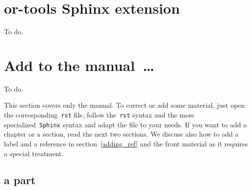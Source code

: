 \documentclass[a4paper,10pt]{article}
\newcommand{\code}[1]{\texttt{#1}}
\begin{document}

\section{or-tools Sphinx extension}

To do.

\section{Add to the manual~\ldots}
\label{write_documentation}

To do.

This section covers only the manual. To correct or add some material, just open the corresponding~\code{rst} file, follow the~\code{rst} syntax and the more specialized~\code{Sphinx} syntax and adapt the file to your needs. If you want to add a chapter or a section, read the next two sections. We discuss also how to add a label and a reference in section~\ref{adding_ref} and the front material as it requires a special treatment.

\subsection{a part}
\end{document}
